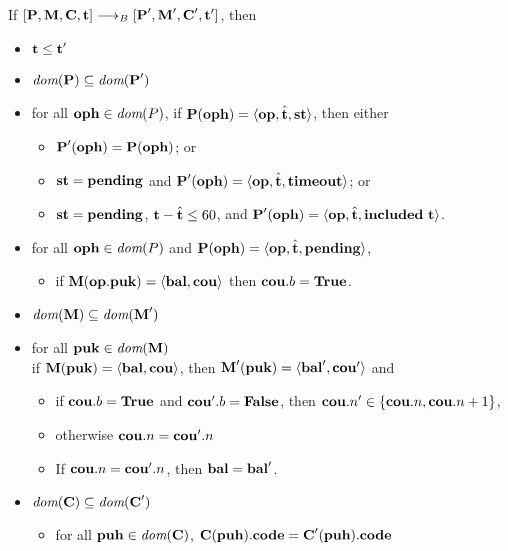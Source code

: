 \documentclass[a4paper]{llncs}
\begin{document}
If $[\textbf{P}, \textbf{M}, \textbf{C}, \textbf{t}] \stackrel{{}}\longrightarrow_B{}
[\textbf{P}', \textbf{M}', \textbf{C}', \textbf{t}']$, then
\begin{itemize}
\item $\textbf{t} \le \textbf{t}'$
\item $\textit{dom} (\textbf{P}) \subseteq \textit{dom}(\textbf{P}')$
\item for all $\textbf{oph} \in \textit{dom}(P)$, if 
  $\textbf{P} (\textbf{oph}) = \langle\textbf{op},  \hat{\textbf{t}}, \textbf{st}\rangle$, then either
  \begin{itemize}
  \item     $\textbf{P}'    (\textbf{oph}) = \textbf{P} (\textbf{oph})$; or
  \item $\textbf{st}  = \textbf{pending}$ and $\textbf{P}' (\textbf{oph}) =
    \langle\textbf{op}, \hat{\textbf{t}}, \textbf{timeout}\rangle$; or
  \item  $\textbf{st}  = \textbf{pending}$, $\textbf{t} - \hat{\textbf{t}}
    \le 60 $, and
    $\textbf{P}' (\textbf{oph}) =       \langle\textbf{op}, \hat{\textbf{t}}, \textbf{included}\
      \textbf{t}\rangle$.
  \end{itemize}
 \item for all $\textbf{oph} \in \textit{dom}(P)$ and $\textbf{P} (\textbf{oph}) = \langle\textbf{op},  \hat{\textbf{t}}, \textbf{pending}\rangle$, 
    \begin{itemize}
    	\item  if $\textbf{M}(\textbf{op}.\textbf{puk}) =  \langle\textbf{bal}, \textbf{cou}\rangle$ then  
  $\textbf{cou}.b = \textbf{True}$.
    \end{itemize}
 \item $ \textit{dom} (\textbf{M}) \subseteq \textit{dom} (\textbf{M}')$
 \item for all $\textbf{puk} \in \textit{dom} (\textbf{M})$\\
   if $\textbf{M} (\textbf{puk}) =
   \langle\textbf{bal}, \textbf{cou}\rangle$, 
   then $\textbf{M}' (\textbf{puk}) =
   \langle\textbf{bal}', \textbf{cou}'\rangle$ and
   \begin{itemize}
   \item if $\textbf{cou}.b=\textbf{True}$ and $\textbf{cou}'.b=\textbf{False}$, then $\textbf{cou}.n' \in \{
     \textbf{cou}.n,  \textbf{cou}.n+1\}$,
   \item otherwise $\textbf{cou}.n = \textbf{cou}'.n$
   \item If $\textbf{cou}.n = \textbf{cou}'.n$, then $\textbf{bal} = \textbf{bal}'$.
   \end{itemize}

 \item $ \textit{dom} (\textbf{C}) \subseteq \textit{dom} (\textbf{C}')$
   \begin{itemize}
   \item for all $\textbf{puh} \in \textit{dom} (\textbf{C})$,
     $\textbf{C} (\textbf{puh}).\textbf{code} = \textbf{C}' (\textbf{puh}).\textbf{code}$
   \end{itemize}
\end{itemize}
\end{document}
